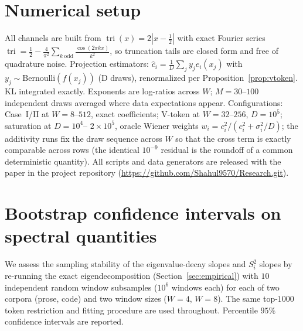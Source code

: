 \documentclass[12pt]{article}
\theoremstyle{remark}
\begin{document}
\section{Numerical setup}
\label{app:numerics}
All channels are built from $\operatorname{tri}(x)=2|x-\tfrac12|$ with exact
Fourier series $\operatorname{tri}=\frac12-\frac4{\pi^2}\sum_{k\ \text{odd}}
\frac{\cos(2\pi kx)}{k^2}$, so truncation tails are closed form and free of
quadrature noise. Projection estimators: $\hat c_i=\frac1D\sum_j
y_j e_i(x_j)$ with $y_j\sim\text{Bernoulli}(f(x_j))$ (D draws), renormalized
per Proposition~\ref{prop:vtoken}. KL integrated exactly. Exponents are
log-ratios across $W$; $M=30$--$100$ independent draws averaged where data
expectations appear. Configurations: Case~I/II at $W=8$--$512$, exact
coefficients; V-token at $W=32$--$256$, $D=10^5$; saturation at $D=10^4$--
$2\times10^5$, oracle Wiener weights $w_i=c_i^2/(c_i^2+\sigma_i^2/D)$; the
additivity runs fix the draw sequence across $W$ so that the cross term is
exactly comparable across rows (the identical $10^{-9}$ residual is the
roundoff of a common deterministic quantity). All scripts and data
generators are released with the paper in the project repository
(\url{https://github.com/Shahul9570/Research.git}).

\section{Bootstrap confidence intervals on spectral quantities}
\label{app:bootstrap}
We assess the sampling stability of the eigenvalue-decay slopes and
$S_i^2$ slopes by re-running the exact eigendecomposition
(Section~\ref{sec:empirical}) with $10$ independent random window subsamples
($10^6$ windows each) for each of two corpora (prose, code) and two window
sizes ($W=4$, $W=8$). The same top-$1000$ token restriction and fitting
procedure are used throughout. Percentile $95\%$ confidence intervals are
reported.
\end{document}
